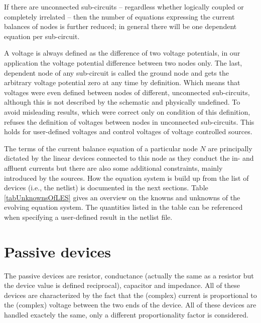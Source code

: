 If there are unconnected sub-circuits -- regardless whether logically
coupled or completely irrelated -- then the number of equations expressing
the current balances of nodes is further reduced; in general there will be
one dependent equation per sub-circuit.

A voltage is always defined as the difference of two voltage potentials,
in our application the voltage potential difference between two nodes
only. The last, dependent node of any sub-circuit is called the ground
node and gets the arbitrary voltage potential zero at any time by
definition. Which means that voltages were even defined between nodes of
different, unconnected sub-circuits, although this is not described by the
schematic and physically undefined. To avoid misleading results, which
were correct only on condition of this definition, \linnet{} refuses the
definition of voltages between nodes in unconnected sub-circuits. This
holds for user-defined voltages and control voltages of voltage controlled
sources.

The terms of the current balance equation of a particular node $N$ are
principally dictated by the linear devices connected to this node as they
conduct the in- and affluent currents but there are also some additional
constraints, mainly introduced by the sources. How the equation system is
build up from the list of devices (i.e., the netlist) is documented in the
next sections. Table \ref{tabUnknownsOfLES} gives an overview on the
knowns and unknowns of the evolving equation system. The quantities listed
in the table can be referenced when specifying a user-defined result in
the netlist file.


\section{Passive devices}

The passive devices are resistor, conductance (actually the same as a
resistor but the device value is defined reciprocal), capacitor and
impedance. All of these devices are characterized by the fact that the
(complex) current is proportional to the (complex) voltage between the two
ends of the device. All of these devices are handled exactely the same,
only a different proportionality factor is considered.

